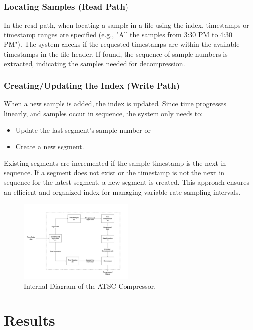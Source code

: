 \documentclass[conference]{IEEEtran}
\begin{document}
\subsubsection{Locating Samples (Read Path)}

In the read path, when locating a sample in a file using the index, timestamps or timestamp ranges are specified (e.g., "All the samples from 3:30 PM to 4:30 PM"). The system checks if the requested timestamps are within the available timestamps in the file header. If found, the sequence of sample numbers is extracted, indicating the samples needed for decompression.
\vspace{5pt}
\subsubsection{Creating/Updating the Index (Write Path)}

When a new sample is added, the index is updated. Since time progresses linearly, and samples occur in sequence, the system only needs to:
\begin{itemize}
    \item Update the last segment's sample number or
    \item Create a new segment.
\end{itemize}

Existing segments are incremented if the sample timestamp is the next in sequence. If a segment does not exist or the timestamp is not the next in sequence for the latest segment, a new segment is created. This approach ensures an efficient and organized index for managing variable rate sampling intervals.

\begin{figure}[h]
  \centering
  \includegraphics[width=0.5\textwidth]{Fig4.png}
  \caption{Internal Diagram of the ATSC Compressor.}
  \label{Fig.5}
\end{figure}
\section{Results}
\end{document}
